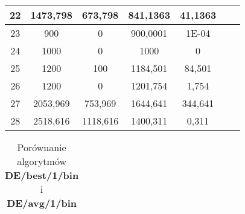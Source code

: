 \documentclass[a4paper,12pt]{article}
\theoremstyle{definition}
\begin{document}
\begin{table}[H]
\begin{tabular}{|c|c|c|c|c|c|c|}
    22    & 1473,798 & 673,798 & 841,1363 & 41,1363 \\\hline
    23    & 900   & 0     & 900,0001 & 1E-04 \\\hline
    24    & 1000  & 0     & 1000  & 0 \\\hline
    25    & 1200  & 100   & 1184,501 & 84,501 \\\hline
    26    & 1200  & 0     & 1201,754 & 1,754 \\\hline
    27    & 2053,969 & 753,969 & 1644,641 & 344,641 \\\hline
    28    & 2518,616 & 1118,616 & 1400,311 & 0,311 \\\hline
\end{tabular}	
\end{table}

\begin{table}[H]
\centering
\def\arraystretch{1.3}
\setlength\tabcolsep{10pt}
\caption{Porównanie algorytmów \textbf{DE/best/1/bin} i \textbf{DE/avg/1/bin}}
\vspace{8pt}
\begin{tabular}{|c|c|c|c|c|c|c|}
	

\end{tabular}
\end{table}
\end{document}
